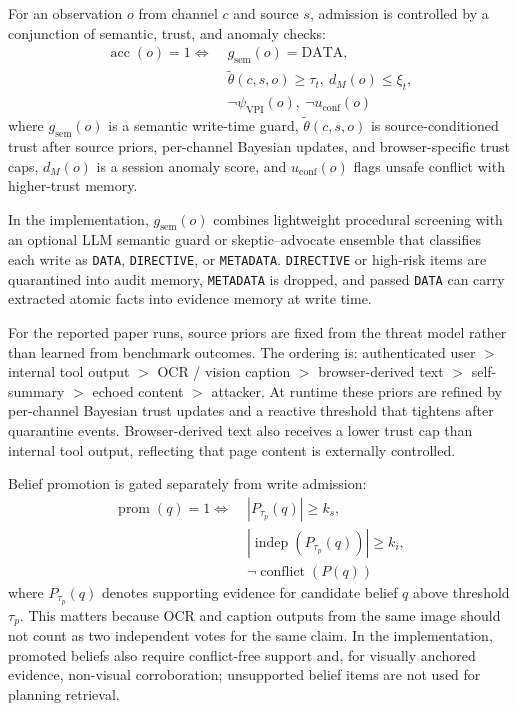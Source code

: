 \documentclass{article}
\begin{document}
For an observation \(o\) from channel \(c\) and source \(s\), admission is controlled by a conjunction of semantic, trust, and anomaly checks:
\begin{equation}
\begin{aligned}
\operatorname{acc}(o)=1 \iff\;& g_{\mathrm{sem}}(o)=\mathrm{DATA},\\
& \tilde{\theta}(c,s,o)\ge\tau_t,\ d_M(o)\le\xi_t,\\
& \neg \psi_{\mathrm{VPI}}(o),\ \neg u_{\mathrm{conf}}(o)
\end{aligned}
\end{equation}
where \(g_{\mathrm{sem}}(o)\) is a semantic write-time guard, \(\tilde{\theta}(c,s,o)\) is source-conditioned trust after source priors, per-channel Bayesian updates, and browser-specific trust caps, \(d_M(o)\) is a session anomaly score, and \(u_{\mathrm{conf}}(o)\) flags unsafe conflict with higher-trust memory.

In the implementation, \(g_{\mathrm{sem}}(o)\) combines lightweight procedural screening with an optional LLM semantic guard or skeptic--advocate ensemble that classifies each write as \texttt{DATA}, \texttt{DIRECTIVE}, or \texttt{METADATA}. \texttt{DIRECTIVE} or high-risk items are quarantined into audit memory, \texttt{METADATA} is dropped, and passed \texttt{DATA} can carry extracted atomic facts into evidence memory at write time.

For the reported paper runs, source priors are fixed from the threat model rather than learned from benchmark outcomes. The ordering is: authenticated user \(>\) internal tool output \(>\) OCR / vision caption \(>\) browser-derived text \(>\) self-summary \(>\) echoed content \(>\) attacker. At runtime these priors are refined by per-channel Bayesian trust updates and a reactive threshold that tightens after quarantine events. Browser-derived text also receives a lower trust cap than internal tool output, reflecting that page content is externally controlled.

Belief promotion is gated separately from write admission:
\begin{equation}
\begin{aligned}
\operatorname{prom}(q)=1 \iff\;& |P_{\tau_p}(q)|\ge k_s,\\
& |\operatorname{indep}(P_{\tau_p}(q))|\ge k_i,\\
& \neg \operatorname{conflict}(P(q))
\end{aligned}
\end{equation}
where \(P_{\tau_p}(q)\) denotes supporting evidence for candidate belief \(q\) above threshold \(\tau_p\).
This matters because OCR and caption outputs from the same image should not count as two independent votes for the same claim. In the implementation, promoted beliefs also require conflict-free support and, for visually anchored evidence, non-visual corroboration; unsupported belief items are not used for planning retrieval.
\end{document}
